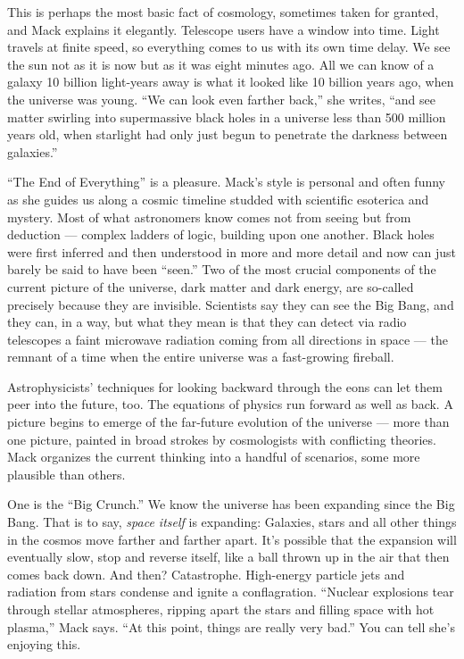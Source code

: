 This is perhaps the most basic fact of cosmology, sometimes taken for
granted, and Mack explains it elegantly. Telescope users have a window
into time. Light travels at finite speed, so everything comes to us with
its own time delay. We see the sun not as it is now but as it was eight
minutes ago. All we can know of a galaxy 10 billion light-years away is
what it looked like 10 billion years ago, when the universe was young.
``We can look even farther back,'' she writes, ``and see matter swirling
into supermassive black holes in a universe less than 500 million years
old, when starlight had only just begun to penetrate the darkness
between galaxies.''

``The End of Everything'' is a pleasure. Mack's style is personal and
often funny as she guides us along a cosmic timeline studded with
scientific esoterica and mystery. Most of what astronomers know comes
not from seeing but from deduction --- complex ladders of logic,
building upon one another. Black holes were first inferred and then
understood in more and more detail and now can just barely be said to
have been ``seen.'' Two of the most crucial components of the current
picture of the universe, dark matter and dark energy, are so-called
precisely because they are invisible. Scientists say they can see the
Big Bang, and they can, in a way, but what they mean is that they can
detect via radio telescopes a faint microwave radiation coming from all
directions in space --- the remnant of a time when the entire universe
was a fast-growing fireball.

Astrophysicists' techniques for looking backward through the eons can
let them peer into the future, too. The equations of physics run forward
as well as back. A picture begins to emerge of the far-future evolution
of the universe --- more than one picture, painted in broad strokes by
cosmologists with conflicting theories. Mack organizes the current
thinking into a handful of scenarios, some more plausible than others.

One is the ``Big Crunch.'' We know the universe has been expanding since
the Big Bang. That is to say, \emph{space itself} is expanding:
Galaxies, stars and all other things in the cosmos move farther and
farther apart. It's possible that the expansion will eventually slow,
stop and reverse itself, like a ball thrown up in the air that then
comes back down. And then? Catastrophe. High-energy particle jets and
radiation from stars condense and ignite a conflagration. ``Nuclear
explosions tear through stellar atmospheres, ripping apart the stars and
filling space with hot plasma,'' Mack says. ``At this point, things are
really very bad.'' You can tell she's enjoying this.

